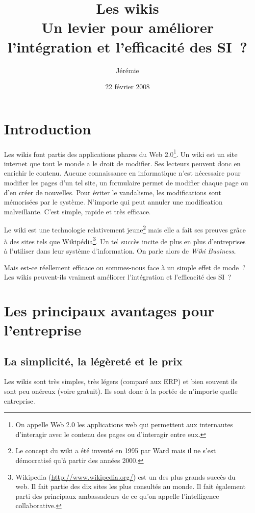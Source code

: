 \documentclass[pdftex,a4paper,11pt]{article}
\begin{document}
\title{Les wikis\\\medskip
       Un levier pour améliorer l'intégration et l'efficacité des SI~?}
\author{Jérémie }
\date{22 février 2008}

\maketitle


\section*{Introduction}
Les wikis font partis des applications phares du Web 2.0\footnote{On appelle Web 2.0 les applications web qui permettent aux internautes d'interagir avec le contenu des pages ou d'interagir entre eux.}. Un wiki est un site internet que tout le monde a le droit de modifier. Ses lecteurs peuvent donc en enrichir le contenu. Aucune connaissance en informatique n'est nécessaire pour modifier les pages d'un tel site, un formulaire permet de modifier chaque page ou d'en créer de nouvelles. Pour éviter le vandalisme, les modifications sont mémorisées par le système. N'importe qui peut annuler une modification malveillante. C'est simple, rapide et très efficace.

Le wiki est une technologie relativement jeune\footnote{Le concept du wiki a été inventé en 1995 par Ward  mais il ne s'est démocratisé qu'à partir des années 2000.} mais elle a fait ses preuves grâce à des sites tels que Wikipédia\footnote{Wikipedia (\url{http://www.wikipedia.org/}) est un des plus grands succès du web. Il fait partie des dix sites les plus consultés au monde. Il fait également parti des principaux ambassadeurs de ce qu'on appelle \og{}l'intelligence collaborative\fg{}.}. Un tel succès incite de plus en plus d'entreprises à l'utiliser dans leur système d'information. On parle alors de \emph{Wiki Business}.

Mais est-ce réellement efficace ou sommes-nous face à un simple effet de mode~? Les wikis peuvent-ils vraiment améliorer l'intégration et l'efficacité des SI~?

\section{Les principaux avantages pour l'entreprise}
\subsection{La simplicité, la légèreté et le prix}
Les wikis sont très simples, très légers (comparé aux ERP) et bien souvent ils sont peu onéreux (voire gratuit). Ils sont donc à la portée de n'importe quelle entreprise.
\end{document}
